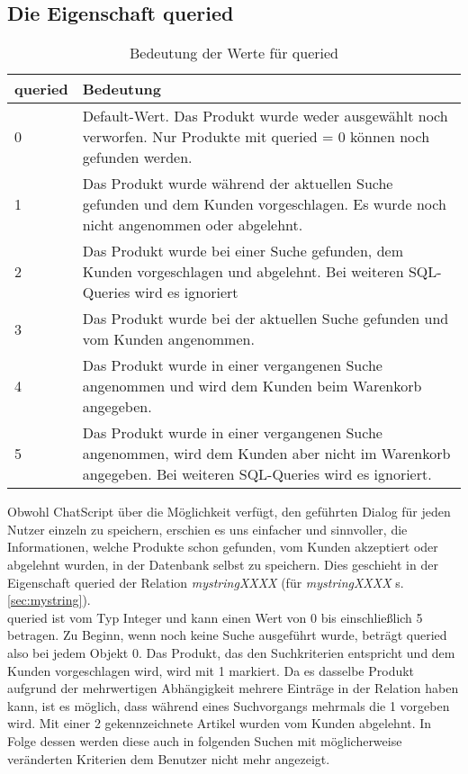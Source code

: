 \subsection{Die Eigenschaft queried}
\label{sec:queried}
\begin{table}
\begin{center}
\begin{tabular}{|p{}|p{}|}
	\hline
	queried & Bedeutung \\ \hline
	0 & Default-Wert. Das Produkt wurde weder ausgewählt noch verworfen. Nur Produkte mit queried = 0 können noch gefunden werden. \\ \hline
	1 & Das Produkt wurde während der aktuellen Suche gefunden und dem Kunden vorgeschlagen. Es wurde noch nicht angenommen oder abgelehnt. \\ \hline
	2 & Das Produkt wurde bei einer Suche gefunden, dem Kunden vorgeschlagen und abgelehnt. Bei weiteren SQL-Queries wird es ignoriert\\ \hline
	3 & Das Produkt wurde bei der aktuellen Suche gefunden und vom Kunden angenommen. \\ \hline
	4 & Das Produkt wurde in einer vergangenen Suche angenommen und wird dem Kunden beim Warenkorb angegeben. \\ \hline
	5 & Das Produkt wurde in einer vergangenen Suche angenommen, wird dem Kunden aber nicht im Warenkorb angegeben. Bei weiteren SQL-Queries wird es ignoriert.\\ \hline
	\end{tabular}
	\caption{Bedeutung der Werte für queried}
\end{center}
\label{ÜbersichtQueried}
\end{table}
Obwohl ChatScript über die Möglichkeit verfügt, den geführten Dialog für jeden Nutzer einzeln zu speichern, erschien es uns einfacher und sinnvoller, die Informationen, welche Produkte schon gefunden, vom Kunden akzeptiert oder abgelehnt wurden, in der Datenbank selbst zu speichern. Dies geschieht in der Eigenschaft queried der Relation \textit{mystringXXXX} (für \textit{mystringXXXX} s. \ref{sec:mystring}).\\
queried ist vom Typ Integer und kann einen Wert von 0 bis einschließlich 5 betragen. Zu Beginn, wenn noch keine Suche ausgeführt wurde, beträgt queried also bei jedem Objekt 0. Das Produkt, das den Suchkriterien entspricht und dem Kunden vorgeschlagen wird, wird mit 1 markiert. Da es dasselbe Produkt aufgrund der mehrwertigen Abhängigkeit mehrere Einträge in der Relation haben kann, ist es möglich, dass während eines Suchvorgangs mehrmals die 1 vorgeben wird. Mit einer 2 gekennzeichnete Artikel wurden vom Kunden abgelehnt. In Folge dessen werden diese auch in folgenden Suchen mit möglicherweise veränderten Kriterien dem Benutzer nicht mehr angezeigt. \\
